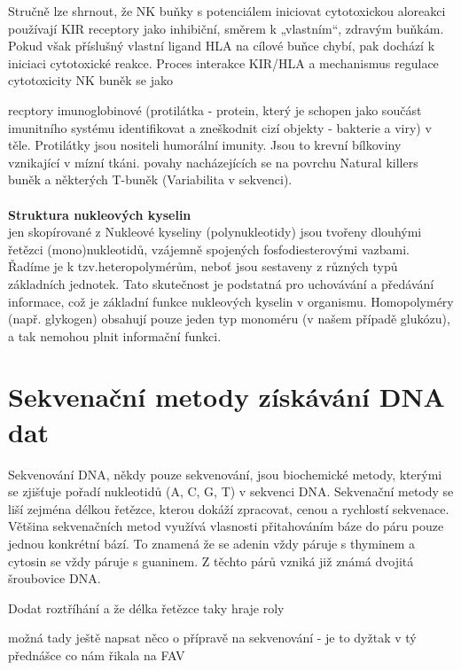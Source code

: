 \documentclass[czech,DP]{thesiskiv}
\begin{document}
Stručně lze shrnout, že NK buňky s potenciálem iniciovat cytotoxickou aloreakci používají
KIR receptory jako inhibiční, směrem k „vlastním“, zdravým buňkám. Pokud však příslušný
vlastní ligand HLA na cílové buňce chybí, pak dochází k iniciaci cytotoxické reakce. Proces
interakce KIR/HLA a mechanismus regulace cytotoxicity NK buněk se jako 

recptory imunoglobinové (protilátka - protein, který je schopen jako součást imunitního systému identifikovat a zneškodnit cizí objekty - bakterie a viry) v těle. Protilátky jsou nositeli humorální imunity. Jsou to krevní bílkoviny vznikající v mízní tkáni.  povahy nacházejících se na povrchu Natural killers buněk a některých T-buněk (Variabilita v sekvenci).
\\
\\
\textbf{Struktura nukleových kyselin} \\
jen skopírované z %
Nukleové kyseliny (polynukleotidy) jsou tvořeny dlouhými řetězci (mono)nukleotidů, vzájemně spojených fosfodiesterovými vazbami. Řadíme je k tzv.heteropolymérům, neboť jsou sestaveny z různých typů základních jednotek. Tato skutečnost je podstatná pro uchovávání a předávání informace, což je základní funkce nukleových kyselin v organismu. Homopolyméry (např. glykogen) obsahují pouze jeden typ monoméru (v našem případě glukózu), a tak nemohou plnit informační funkci.




\chapter{Sekvenační metody získávání DNA dat}
Sekvenování DNA, někdy pouze sekvenování, jsou biochemické metody, kterými se zjišťuje pořadí nukleotidů (A, C, G, T) v sekvenci DNA. Sekvenační metody se liší zejména délkou řetězce, kterou dokáží zpracovat, cenou a rychlostí sekvenace. Většina sekvenačních metod využívá vlasnosti přitahováním báze do páru pouze jednou konkrétní bází. To znamená že se adenin vždy páruje s thyminem a cytosin se vždy páruje s guaninem. Z těchto párů vzniká již známá dvojitá šroubovice DNA. \cite{sekvenovani_ziva}


Dodat roztříhání a že délka řetězce taky hraje roly

možná tady ještě napsat něco o přípravě na sekvenování - je to dyžtak v tý přednášce co nám řikala na FAV
\\
\end{document}
